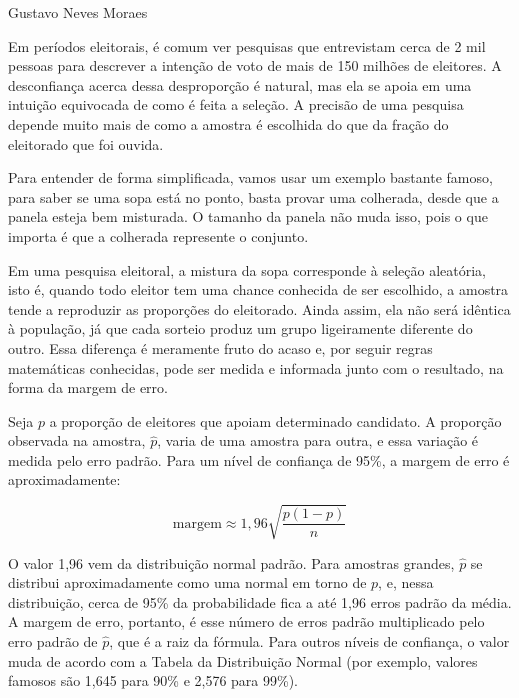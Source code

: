 {Gustavo Neves Moraes}
{

\hspace*{1.5em}
Em períodos eleitorais, é comum ver pesquisas que entrevistam cerca de 2 mil pessoas
para descrever a intenção de voto de mais de 150 milhões de eleitores.
A desconfiança acerca dessa desproporção é natural,
mas ela se apoia em uma intuição equivocada de como é feita a seleção.
A precisão de uma pesquisa depende muito mais de como a amostra é escolhida
do que da fração do eleitorado que foi ouvida.

\subtitle{Por que uma amostra pequena pode bastar}

\hspace*{1.5em}
Para entender de forma simplificada, vamos usar um exemplo bastante famoso,
para saber se uma sopa está no ponto, basta provar uma colherada, desde que a panela esteja bem misturada.
O tamanho da panela não muda isso,
pois o que importa é que a colherada represente o conjunto.

\hspace*{1.5em}
Em uma pesquisa eleitoral, a mistura da sopa corresponde à seleção aleatória, isto é,
quando todo eleitor tem uma chance conhecida de ser escolhido,
a amostra tende a reproduzir as proporções do eleitorado.
Ainda assim, ela não será idêntica à população,
já que cada sorteio produz um grupo ligeiramente diferente do outro.
Essa diferença é meramente fruto do acaso e, por seguir regras matemáticas conhecidas,
pode ser medida e informada junto com o resultado, na forma da margem de erro.

\subtitle{Quanto a amostra pode errar}

\hspace*{1.5em}
Seja $p$ a proporção de eleitores que apoiam determinado candidato.
A proporção observada na amostra, $\hat{p}$, varia de uma amostra para outra,
e essa variação é medida pelo erro padrão.
Para um nível de confiança de 95\%, a margem de erro é aproximadamente:

\[
\text{margem} \approx 1{,}96 \sqrt{\frac{p(1-p)}{n}}
\]

\hspace*{1.5em}
O valor 1,96 vem da distribuição normal padrão.
Para amostras grandes, $\hat{p}$ se distribui aproximadamente como uma normal em torno de $p$,
e, nessa distribuição, cerca de 95\% da probabilidade fica a até 1,96 erros padrão da média.
A margem de erro, portanto, é esse número de erros padrão
multiplicado pelo erro padrão de $\hat{p}$, que é a raiz da fórmula.
Para outros níveis de confiança, o valor muda de acordo com a Tabela da Distribuição Normal (por
exemplo, valores famosos são 1,645 para 90\% e 2,576 para 99\%).

}
